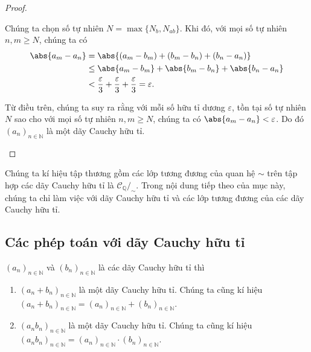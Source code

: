 \begin{proof}
\begin{enumerate}[label={(\roman*)},itemsep=0pt]
              Chúng ta chọn số tự nhiên $N = \max\{ N_{b}, N_{ab} \}$. Khi đó, với mọi số tự nhiên $n, m\geq N$, chúng ta có
              \begin{align*}
                  \abs{a_{m} - a_{n}} & = \abs{(a_{m} - b_{m}) + (b_{m} - b_{n}) + (b_{n} - a_{n})}                            \\
                                      & \leq \abs{a_{m} - b_{m}} + \abs{b_{m} - b_{n}} + \abs{b_{n} - a_{n}}                   \\
                                      & < \frac{\varepsilon}{3} + \frac{\varepsilon}{3} + \frac{\varepsilon}{3} = \varepsilon.
              \end{align*}

              Từ điều trên, chúng ta suy ra rằng với mỗi số hữu tỉ dương $\varepsilon$, tồn tại số tự nhiên $N$ sao cho với mọi số tự nhiên $n, m\geq N$, chúng ta có $\abs{a_{m} - a_{n}} < \varepsilon$. Do đó ${(a_{n})}_{n\in\mathbb{N}}$ là một dãy Cauchy hữu tỉ.
    \end{enumerate}
\end{proof}

Chúng ta kí hiệu tập thương gồm các lớp tương đương của quan hệ $\sim$ trên tập hợp các dãy Cauchy hữu tỉ là $\mathscr{C}_{\mathbb{Q}}/_{\sim}$. Trong nội dung tiếp theo của mục này, chúng ta chỉ làm việc với dãy Cauchy hữu tỉ và các lớp tương đương của các dãy Cauchy hữu tỉ.

\subsection{Các phép toán với dãy Cauchy hữu tỉ}

\begin{theorem}\label{theorem:addition-and-multiplication-of-cauchy-sequences}
    ${(a_{n})}_{n\in\mathbb{N}}$ và ${(b_{n})}_{n\in\mathbb{N}}$ là các dãy Cauchy hữu tỉ thì
    \begin{enumerate}[label={(\roman*)}]
        \item ${(a_{n} + b_{n})}_{n\in\mathbb{N}}$ là một dãy Cauchy hữu tỉ. Chúng ta cũng kí hiệu ${(a_{n} + b_{n})}_{n\in\mathbb{N}} = {(a_{n})}_{n\in\mathbb{N}} + {(b_{n})}_{n\in\mathbb{N}}$.
        \item ${(a_{n}b_{n})}_{n\in\mathbb{N}}$ là một dãy Cauchy hữu tỉ. Chúng ta cũng kí hiệu ${(a_{n}b_{n})}_{n\in\mathbb{N}} = {(a_{n})}_{n\in\mathbb{N}}\cdot {(b_{n})}_{n\in\mathbb{N}}$.
    \end{enumerate}
\end{theorem}

